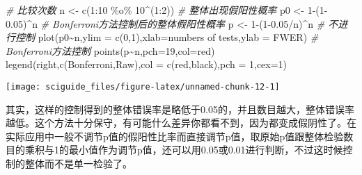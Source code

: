 \documentclass[]{tufte-book}
\newenvironment{Shaded}{}{}
\newcommand{\AttributeTok}[1]{\textcolor[rgb]{0.49,0.56,0.16}{#1}}
\newcommand{\CommentTok}[1]{\textcolor[rgb]{0.38,0.63,0.69}{\textit{#1}}}
\newcommand{\DecValTok}[1]{\textcolor[rgb]{0.25,0.63,0.44}{#1}}
\newcommand{\FloatTok}[1]{\textcolor[rgb]{0.25,0.63,0.44}{#1}}
\newcommand{\FunctionTok}[1]{\textcolor[rgb]{0.02,0.16,0.49}{#1}}
\newcommand{\NormalTok}[1]{#1}
\newcommand{\OtherTok}[1]{\textcolor[rgb]{0.00,0.44,0.13}{#1}}
\newcommand{\SpecialCharTok}[1]{\textcolor[rgb]{0.25,0.44,0.63}{#1}}
\newcommand{\StringTok}[1]{\textcolor[rgb]{0.25,0.44,0.63}{#1}}
\begin{document}
\begin{Shaded}
\begin{Highlighting}[]
\CommentTok{\# 比较次数}
\NormalTok{n }\OtherTok{\textless{}{-}} \FunctionTok{c}\NormalTok{(}\DecValTok{1}\SpecialCharTok{:}\DecValTok{10} \SpecialCharTok{\%o\%} \DecValTok{10}\SpecialCharTok{\^{}}\NormalTok{(}\DecValTok{1}\SpecialCharTok{:}\DecValTok{2}\NormalTok{))}
\CommentTok{\# 整体出现假阳性概率}
\NormalTok{p0 }\OtherTok{\textless{}{-}} \DecValTok{1}\SpecialCharTok{{-}}\NormalTok{(}\DecValTok{1}\FloatTok{{-}0.05}\NormalTok{)}\SpecialCharTok{\^{}}\NormalTok{n}
\CommentTok{\# Bonferroni方法控制后的整体假阳性概率}
\NormalTok{p }\OtherTok{\textless{}{-}} \DecValTok{1}\SpecialCharTok{{-}}\NormalTok{(}\DecValTok{1}\FloatTok{{-}0.05}\SpecialCharTok{/}\NormalTok{n)}\SpecialCharTok{\^{}}\NormalTok{n}
\CommentTok{\# 不进行控制}
\FunctionTok{plot}\NormalTok{(p0}\SpecialCharTok{\textasciitilde{}}\NormalTok{n,}\AttributeTok{ylim =} \FunctionTok{c}\NormalTok{(}\DecValTok{0}\NormalTok{,}\DecValTok{1}\NormalTok{),}\AttributeTok{xlab=}\StringTok{\textquotesingle{}numbers of tests\textquotesingle{}}\NormalTok{,}\AttributeTok{ylab =} \StringTok{\textquotesingle{}FWER\textquotesingle{}}\NormalTok{)}
\CommentTok{\# Bonferroni方法控制}
\FunctionTok{points}\NormalTok{(p}\SpecialCharTok{\textasciitilde{}}\NormalTok{n,}\AttributeTok{pch=}\DecValTok{19}\NormalTok{,}\AttributeTok{col=}\StringTok{\textquotesingle{}red\textquotesingle{}}\NormalTok{)}
\FunctionTok{legend}\NormalTok{(}\StringTok{\textquotesingle{}right\textquotesingle{}}\NormalTok{,}\FunctionTok{c}\NormalTok{(}\StringTok{\textquotesingle{}Bonferroni\textquotesingle{}}\NormalTok{,}\StringTok{\textquotesingle{}Raw\textquotesingle{}}\NormalTok{),}\AttributeTok{col =} \FunctionTok{c}\NormalTok{(}\StringTok{\textquotesingle{}red\textquotesingle{}}\NormalTok{,}\StringTok{\textquotesingle{}black\textquotesingle{}}\NormalTok{),}\AttributeTok{pch =} \DecValTok{1}\NormalTok{,}\AttributeTok{cex=}\DecValTok{1}\NormalTok{)}
\end{Highlighting}
\end{Shaded}

\texttt{[image: sciguide\_files/figure-latex/unnamed-chunk-12-1]}

其实，这样的控制得到的整体错误率是略低于0.05的，并且数目越大，整体错误率越低。这个方法十分保守，有可能什么差异你都看不到，因为都变成假阴性了。在实际应用中一般不调节p值的假阳性比率而直接调节p值，取原始p值跟整体检验数目的乘积与1的最小值作为调节p值，还可以用0.05或0.01进行判断，不过这时候控制的整体而不是单一检验了。
\end{document}
